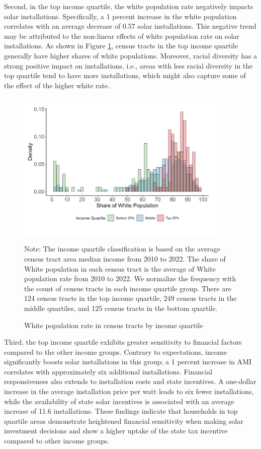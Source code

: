 \documentclass[11pt,twoside,letterpaper]{article}
\begin{document}
Second, in the top income quartile, the white population rate negatively impacts solar installations. Specifically, a 1 percent increase in the white population correlates with an average decrease of 0.57 solar installations. This negative trend may be attributed to the non-linear effects of white population rate on solar installations. As shown in Figure \ref{fig:combined_income_WH}, census tracts in the top income quartile generally have higher shares of white populations. Moreover, racial diversity has a strong positive impact on installations, i.e., areas with less racial diversity in the top quartile tend to have more installations, which might also capture some of the effect of the higher white rate. 

\begin{figure}[!ht]
    \centering
\includegraphics[width=0.9\textwidth]{figures/combined_income_WH.png}
    \caption{White population rate in census tracts by income quartile}
    \label{fig:combined_income_WH}
     \begin{flushleft}
        \footnotesize Note: The income quartile classification is based on the average census tract area median income from 2010 to 2022. The share of White population in each census tract is the average of White population rate from 2010 to 2022. We normalize the frequency with the count of census tracts in each income quartile group. There are 124 census tracts in the top income quartile, 249 census tracts in the middle quartiles, and 125 census tracts in the bottom quartile.
    \end{flushleft}
\end{figure}

Third, the top income quartile exhibits greater sensitivity to financial factors compared to the other income groups. Contrary to expectations, income significantly boosts solar installations in this group; a 1 percent increase in AMI correlates with approximately six additional installations. Financial responsiveness also extends to installation costs and state incentives. A one-dollar increase in the average installation price per watt leads to six fewer installations, while the availability of state solar incentives is associated with an average increase of 11.6 installations. These findings indicate that households in top quartile areas demonstrate heightened financial sensitivity when making solar investment decisions and show a higher uptake of the state tax incentive compared to other income groups.
\end{document}
